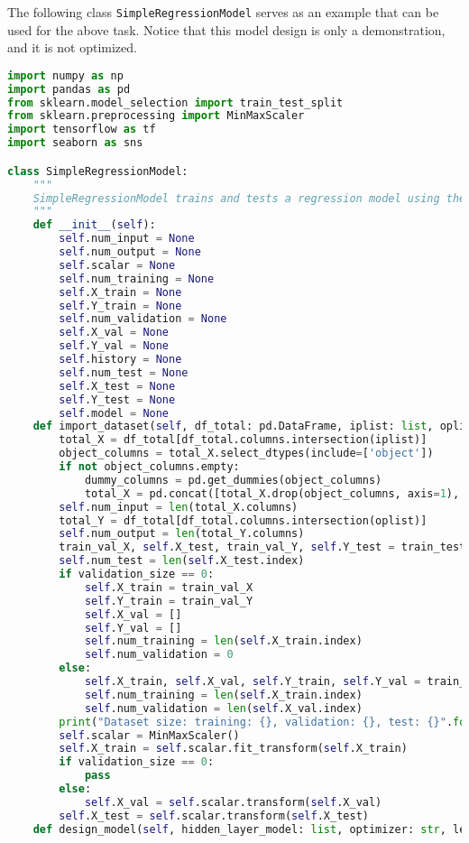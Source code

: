 The following class \verb|SimpleRegressionModel| serves as an example that can be used for the above task. Notice that this model design is only a demonstration, and it is not optimized.
\begin{lstlisting}[language=Python]
import numpy as np
import pandas as pd
from sklearn.model_selection import train_test_split
from sklearn.preprocessing import MinMaxScaler
import tensorflow as tf
import seaborn as sns

class SimpleRegressionModel:
	"""
	SimpleRegressionModel trains and tests a regression model using the given data frame.
	"""
	def __init__(self):
		self.num_input = None
		self.num_output = None
		self.scalar = None
		self.num_training = None
		self.X_train = None
		self.Y_train = None
		self.num_validation = None
		self.X_val = None
		self.Y_val = None
		self.history = None
		self.num_test = None
		self.X_test = None
		self.Y_test = None
		self.model = None
	def import_dataset(self, df_total: pd.DataFrame, iplist: list, oplist: list, validation_size: float, test_size: float):
        total_X = df_total[df_total.columns.intersection(iplist)]
        object_columns = total_X.select_dtypes(include=['object'])
        if not object_columns.empty:
            dummy_columns = pd.get_dummies(object_columns)
            total_X = pd.concat([total_X.drop(object_columns, axis=1), dummy_columns], axis=1)
        self.num_input = len(total_X.columns)
        total_Y = df_total[df_total.columns.intersection(oplist)]
        self.num_output = len(total_Y.columns)
        train_val_X, self.X_test, train_val_Y, self.Y_test = train_test_split(total_X, total_Y, test_size=test_size, random_state=None)
        self.num_test = len(self.X_test.index)
		if validation_size == 0:
			self.X_train = train_val_X
			self.Y_train = train_val_Y
			self.X_val = []
			self.Y_val = []
			self.num_training = len(self.X_train.index)
			self.num_validation = 0
		else:
			self.X_train, self.X_val, self.Y_train, self.Y_val = train_test_split(train_val_X, train_val_Y, test_size=validation_size/(1-test_size), random_state=None)
			self.num_training = len(self.X_train.index)
			self.num_validation = len(self.X_val.index)
		print("Dataset size: training: {}, validation: {}, test: {}".format(self.num_training, self.num_validation, self.num_test))
		self.scalar = MinMaxScaler()
		self.X_train = self.scalar.fit_transform(self.X_train)
		if validation_size == 0:
			pass
		else:
			self.X_val = self.scalar.transform(self.X_val)
		self.X_test = self.scalar.transform(self.X_test)
	def design_model(self, hidden_layer_model: list, optimizer: str, learning_rate: float, loss: str):

\end{lstlisting}
